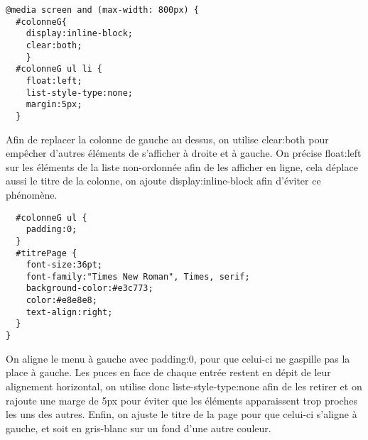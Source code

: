 \begin{verbatim}
@media screen and (max-width: 800px) {
  #colonneG{
    display:inline-block;
    clear:both;
    }
  #colonneG ul li {
    float:left;
    list-style-type:none;
    margin:5px;
  }
  \end{verbatim}
   Afin de replacer la colonne de gauche au dessus, on utilise clear:both pour empêcher d'autres éléments de s'afficher à droite et à gauche. On précise float:left sur les éléments de la liste non-ordonnée afin de les afficher en ligne, cela déplace aussi le titre de la colonne, on ajoute display:inline-block afin d'éviter ce phénomène.
  \begin{verbatim}
  #colonneG ul {
    padding:0;
  }
  #titrePage {
    font-size:36pt;
    font-family:"Times New Roman", Times, serif;
    background-color:#e3c773;
    color:#e8e8e8;
    text-align:right;
  }
}
\end{verbatim}


 On aligne le menu à gauche avec padding:0, pour que celui-ci ne gaspille pas la place à gauche. Les puces en face de chaque entrée restent en dépit de leur alignement horizontal, on utilise donc liste-style-type:none afin de les retirer et on rajoute une marge de 5px pour éviter que les éléments apparaissent trop proches les uns des autres. Enfin, on ajuste le titre de la page pour que celui-ci s'aligne à gauche, et soit en gris-blanc sur un fond d'une autre couleur.

